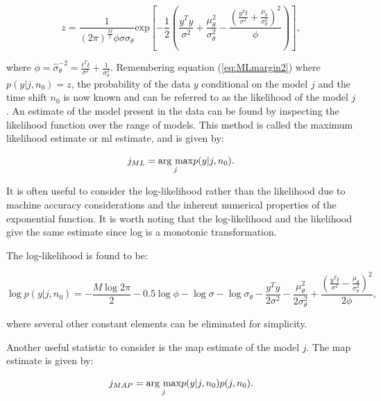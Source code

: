 \begin{equation}\label{eq:MLprod7}
z = \frac{1}{\left(2 \pi\right)^{\frac{M}{2}}\phi \sigma \sigma_\theta}\textrm{exp}\left[-\frac{1}{2}\left(\frac{y^T y}{\sigma^2}+\frac{\mu_\theta^2}{\sigma_\theta^2} - \frac{\left(\frac{y^T t}{\sigma^2}+\frac{\mu_\theta}{\sigma_\theta^2}\right)^2}{\phi}\right)\right],
\end{equation}

where $\phi = \hat{\sigma}^{-2}_\theta = \frac{t^Tt}{\sigma^2} + \frac{1}{\sigma_\theta^2}$. Remembering equation (\ref{eq:MLmargin2}) \linebreak[0]where \linebreak[0]$p(y|j,n_0) = z$, the probability of the data $y$ conditional on the model $j$ and the time shift $n_0$ is now known and can be referred to as the likelihood of the model $j$. An estimate of the model present in the data can be found by inspecting the likelihood function over the range of models. This method is called the maximum likelihood estimate or \gls{ml} estimate, and is given by:

\begin{equation}\label{eq:MLdefinition}
j_{ML} = \underset{j}{\mathrm{arg~max}} p(y|j,n_0).
\end{equation}

It is often useful to consider the log-likelihood rather than the likelihood due to machine accuracy considerations and the inherent numerical properties of the exponential function. It is worth noting that the log-likelihood and the likelihood give the same estimate since log is a monotonic transformation.

The log-likelihood is found to be:

\begin{equation}\label{eq:MLloglikelihood}
\log{p(y|j,n_0)} = -\frac{M\log{2\pi}}{2} - 0.5\log{\phi} - \log{\sigma} -\log{\sigma_\theta} - \frac{y^T y}{2\sigma^2} -\frac{\mu^2_\theta}{2\sigma^2_\theta} + \frac{\left(\frac{y^T t}{\sigma^2}-\frac{\mu_\theta}{\sigma^2_\theta}\right)^2}{2\phi},
\end{equation}

where several other constant elements can be eliminated for simplicity.

Another useful statistic to consider is the \gls{map} estimate of the model $j$. The \gls{map} estimate is given by:

\begin{equation}\label{eq:MAPdefinition}
j_{MAP} = \underset{j}{\mathrm{arg~max}} p(y|j,n_0)p(j,n_0).
\end{equation}


